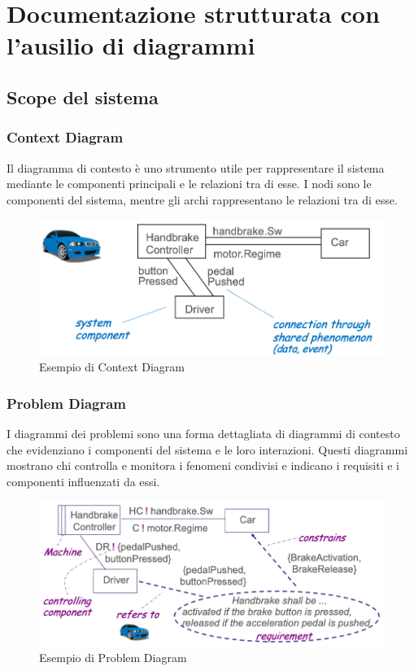 \section{Documentazione strutturata con l'ausilio di diagrammi}
\subsection{Scope del sistema}
\subsubsection{Context Diagram}
Il diagramma di contesto è uno strumento utile per rappresentare il sistema mediante 
le componenti principali e le relazioni tra di esse. I nodi sono le componenti del sistema,
mentre gli archi rappresentano le relazioni tra di esse. 
\begin{figure}[H]
    \centering
    \includegraphics[scale=0.4]{img/context.png}
    \caption{Esempio di Context Diagram}
\end{figure}
\subsubsection{Problem Diagram}
I diagrammi dei problemi sono una forma dettagliata di diagrammi
di contesto che evidenziano i componenti del sistema e le loro interazioni.
Questi diagrammi mostrano chi controlla e monitora i fenomeni condivisi e
indicano i requisiti e i componenti influenzati da essi. 

\begin{figure}[H]
    \centering
    \includegraphics[scale=0.4]{img/problem.png}
    \caption{Esempio di Problem Diagram}
\end{figure}

